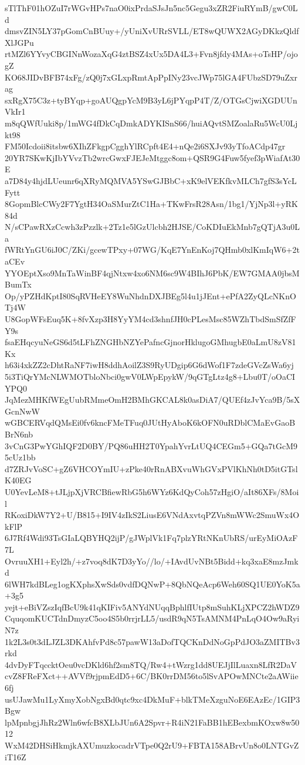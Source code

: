 sTlThF01hOZuI7rWGvHPs7naO0ixPrdaSJsJn5nc5Gegu3xZR2FiuRYmB/gwC0Ld
dmsvZIN5LY37pGomCnBUuy+/yUniXvURrSVLL/ET8wQUWX2AGyDKkzQldfXlJGPu
rtMZl6YYvyCBGINnWozaXqG4ztBSZ4xUx5DA4L3+Fvn8jfdy4MAs+oTsHP/ojogZ
KO68JIDvBFB74xFg/zQ0j7xGLxpRmtApPpINy23vcJWp75lGA4FUbzSD79uZxrag
sxRgX75C3z+tyBYqp+goAUQgpYcM9B3yL6jPYqpP4T/Z/OTGsCjwiXGDUUnVkIr1
m8qQWfUuki8p/1mWG4fDkCqDmkADYKISnS66/huiAQvtSMZoalaRu5WcU0Ljkt98
FM50Icdoii8itsbw6XIhZFkgpCgghYlRCpft4E4+nQe2i6SXJv93yTfoACdp47gr
20YR7SKwKjIbYVvzTb2wrcGwxFJEJeMtggc8om+QSR9G4Fuw5fyef3pWiafAt30E
a7D84y4hjdLUeunr6qXRyMQMVA5YSwGJBbC+xK9elVEKfkvMLCh7gfS3sYcLFytt
8GopmBlcCWy2F7YgtH34OaSMurZtC1Ha+TKwFrsR28Asn/1bg1/YjNp3l+yRK84d
N/sCPawRXzCcwh3zPzzlk+2Tz1e5lGzUlcbh2HJSE/CoKDIuEkMnb7gQTjA3u0La
fWRtYnGU6iJ0C/ZKi/gcewTPxy+07WG/KqE7YnEnKoj7QHmb0xlKmIqW6+2taCEv
YYOEptXso9MnTaWinBF4qjNtxw4xo6NM6sc9W4BIhJ6PbK/EW7GMAA0jbsMBumTx
Op/yPZHdKptI80SqRVHeEY8WuNhdnDXJBEg5l4u1jJEnt+ePfA2ZyQLcNKnOTj4W
U8GopWFsEuq5K+8fvXzp3H8YyYM4cd3shnfJH0cPLesMsc85WZhTbdSmSfZfFY9s
fsaEHqcyuNeGS6d5tLFhZNGHbNZYePafncGjnorHklugoGMhugbE0aLmU8zV81Kx
h63i4xkZZ2cDhtRaNF7iwH8ddhAoilZ3S9RyUDgip6G6dWof1F7zdeGVcZsWa6yj
5i3TiQrYMcNLWMOTbloNbci0gwV0LWpEpykW/9qGTgLtz4g8+Lbu0T/oOaCIYPQ0
JqMezMHKfWEgUubRMmeOmH2BMhGKCAL8k0asDiA7/QUEf4zJvYca9B/5sXGcnNwW
wGBCERVqdQMsEi0fv6kncFMeTFuq0JUtHyAboK6kOFN0uRDblCMaEvGaoBBrN6nb
3vCnG3PwYGhIQF2D0BY/PQ86uHH2T0YpahYvrLtUQ4CEGm5+GQa7tGcM95cUz1bb
d7ZRJvVoSC+gZ6VHCOYmIU+zPke40rRnABXvuWhGVxPVlKhNh0tD5itGTslK40EG
U0YevLeM8+tJLjpXjVRCBfiewRbG5h6WYz6KdQyCoh57zHgiO/aIt86XFs/8Moil
RKoxiDkW7Y2+U/B815+I9IV4zIkS2LiusE6VNdAxvtqPZVn8mWWc2SmuWx4OkFlP
6J7Rf4Wdi93TsGIaLQBYHQ2ijP/gJWplVk1Fq7plzYRtNKnUbRS/urEyMiOAzF7L
OvruuXH1+Eyl2h/+z7voq8dK7D3yYo//lo/+IAvdUvNBt5Bidd+kq3xaE8mzJmkd
6lWH7kdBLeg1ogKXphsXwSds0vdfDQNwP+8QbNQeAcp6Weh60SQ1UE0YoK5a+3g5
yejt+eBiVZszIqfBcU9k41qKIFiv5ANYdNUqqBphlfIUtp8mSuhKLjXPCZ2hWDZ9
CquqomKUCTdnDmyzC5oo4S5b0rrjrLL5/usdR9qN5TsAMNM4PnLqO4Ow9aRyiN7z
1k2L3s0t3dLJZL3DKAhfvPd8c57pawW13aDofTQCKnDdNoGpPdJO3aZMITBv3rkd
4dvDyFTqccktOeu0vcDKld6hf2sm8TQ/Rw4+tWzrg1dd8UEJjIlLuaxn8LfR2DaV
cvZ8FReFXct++AVVf9rjpmEdD5+6C/BK0rrDM56to5lSvAPOwMNCte2aAWiie6fj
usUJawMu1LyXmyXobNgxBd0qtc9xc4DkMuF+blkTMeXzguNoE6EAzEc/1GIP3Bgw
lpMpnbgjJhRz2Wln6wfcB8XLbJUn6A2Spvr+R4iN21FaBB1hEBexbmKOxw8w5012
WxM42DHSiHkmjkAXUmuzkocadrVTpe0Q2rU9+FBTA158ABrvUn8o0LNTGvZiT16Z
